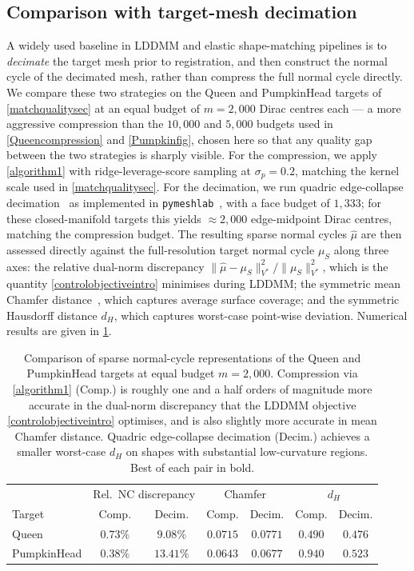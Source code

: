\documentclass[sn-mathphys-num]{sn-jnl}%
\theoremstyle{thmstyleone}%
\theoremstyle{thmstyletwo}%
\theoremstyle{thmstylethree}%
\numberwithin{remark}{section}
\numberwithin{definition}{section}
\numberwithin{equation}{section}
\numberwithin{theorem}{section}
\begin{document}
\subsection{Comparison with target-mesh decimation}\label{decimsec}
A widely used baseline in LDDMM and elastic shape-matching pipelines is to
\emph{decimate} the target mesh prior to registration, and then construct
the normal cycle of the decimated mesh, rather than compress the full
normal cycle directly. We compare these two strategies on the Queen and
PumpkinHead targets of \cref{matchqualitysec} at an equal budget of
$m=2{,}000$ Dirac centres each --- a more aggressive compression than the
$10{,}000$ and $5{,}000$ budgets used in \cref{Queencompression} and
\cref{Pumpkinfig}, chosen here so that any quality gap between the two
strategies is sharply visible. For the compression, we apply \cref{algorithm1} with ridge-leverage-score
sampling at $\sigma_{p}=0.2$, matching the kernel scale used in
\cref{matchqualitysec}. For the decimation, we run quadric edge-collapse
decimation~\cite{Garland1997QEM} as implemented in
\texttt{pymeshlab}~\cite{Pymeshlab}, with a face budget of $1{,}333$; for
these closed-manifold targets this yields $\approx 2{,}000$ edge-midpoint
Dirac centres, matching the compression budget. The resulting sparse normal
cycles $\hat{\mu}$ are then assessed directly against the full-resolution
target normal cycle $\mu_{S}$ along three axes: the relative
dual-norm discrepancy
$\|\hat{\mu}-\mu_{S}\|_{V^{*}}^{2}/\|\mu_{S}\|_{V^{*}}^{2}$, which is the
quantity \cref{controlobjectiveintro} minimises during LDDMM; the symmetric
mean Chamfer distance~\cite{Chamferref}, which captures average surface
coverage; and the symmetric Hausdorff distance $d_{H}$, which captures
worst-case point-wise deviation. Numerical results are given in
\cref{tab:decim}.

\begin{table}[h]
\caption{Comparison of sparse normal-cycle representations of the Queen and
PumpkinHead targets at equal budget $m=2{,}000$. Compression via
\cref{algorithm1} (Comp.) is roughly one and a half orders of magnitude more
accurate in the dual-norm discrepancy that the LDDMM objective
\cref{controlobjectiveintro} optimises, and is also slightly more accurate
in mean Chamfer distance. Quadric edge-collapse decimation (Decim.) achieves
a smaller worst-case $d_{H}$ on shapes with substantial low-curvature regions. Best of each pair in bold.}\label{tab:decim}
\begin{tabular}{@{}l|cc|cc|cc@{}}
\toprule
& \multicolumn{2}{c|}{Rel.\ NC discrepancy} & \multicolumn{2}{c|}{Chamfer} & \multicolumn{2}{c}{$d_{H}$} \\
Target & Comp. & Decim. & Comp. & Decim. & Comp. & Decim. \\
\midrule
Queen        & $\mathbf{0.73\%}$ & $9.08\%$  & $\mathbf{0.0715}$ & $0.0771$ & $0.490$ & $\mathbf{0.476}$ \\
PumpkinHead  & $\mathbf{0.38\%}$ & $13.41\%$ & $\mathbf{0.0643}$ & $0.0677$ & $0.940$ & $\mathbf{0.523}$ \\
\bottomrule
\end{tabular}
\end{table}
 
\end{document}
